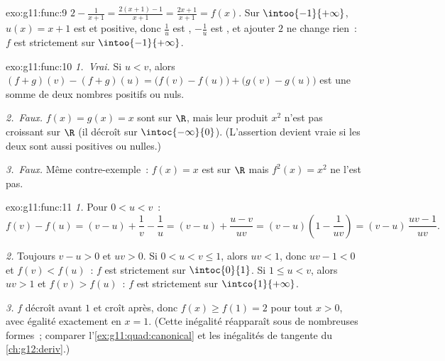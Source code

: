 \begin{solution}{exo:g11:func:9}
$2 - \frac{1}{x+1} = \frac{2(x+1) - 1}{x+1} = \frac{2x+1}{x+1} = f(x)$.
Sur $\intoo{-1}{+\infty}$, $u(x) = x + 1$ est  et positive,
donc $\frac1u$ est , $-\frac1u$ est , et ajouter
$2$ ne change rien~: $f$ est strictement  sur
$\intoo{-1}{+\infty}$.
\end{solution}

\begin{solution}{exo:g11:func:10}
\emph{1.~Vrai.} Si $u < v$, alors
$(f+g)(v) - (f+g)(u) = \bigl(f(v)-f(u)\bigr) + \bigl(g(v)-g(u)\bigr)$
est une somme de deux nombres positifs ou nuls.

\emph{2.~Faux.} $f(x) = g(x) = x$ sont  sur $\R$, mais leur
produit $x^2$ n'est pas croissant sur $\R$ (il décroît sur
$\intoc{-\infty}{0}$). (L'assertion devient vraie si les deux 
sont aussi positives ou nulles.)

\emph{3.~Faux.} Même contre-exemple~: $f(x) = x$ est  sur
$\R$ mais $f^2(x) = x^2$ ne l'est pas.
\end{solution}

\begin{solution}{exo:g11:func:11}
\emph{1.} Pour $0 < u < v$~:
\[
f(v) - f(u) = (v - u) + \frac1v - \frac1u
= (v - u) + \frac{u - v}{uv}
= (v - u)\left(1 - \frac{1}{uv}\right)
= (v - u)\,\frac{uv - 1}{uv}.
\]

\emph{2.} Toujours $v - u > 0$ et $uv > 0$. Si $0 < u < v \leq 1$,
alors $uv < 1$, donc $uv - 1 < 0$ et $f(v) < f(u)$~: $f$ est strictement
 sur $\intoc{0}{1}$. Si $1 \leq u < v$, alors $uv > 1$ et
$f(v) > f(u)$~: $f$ est strictement  sur
$\intco{1}{+\infty}$.

\emph{3.} $f$ décroît avant $1$ et croît après, donc
$f(x) \geq f(1) = 2$ pour tout $x > 0$, avec égalité exactement en
$x = 1$. (Cette inégalité réapparaît sous de nombreuses formes~;
comparer l'\cref{ex:g11:quad:canonical} et les inégalités de tangente
du \cref{ch:g12:deriv}.)
\end{solution}

